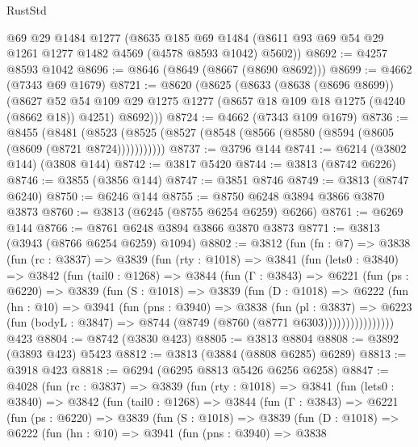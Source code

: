 \begin{lexlean}{RustStd}
\begin{coremodule}
    @69
    @29
    @1484
    @1277
    (@8635 @185 @69 @1484 (@8611 @93 @69 @54 @29 @1261 @1277 @1482 @4569 (@4578 @8593 @1042) @5602))
@8692 := @4257 @8593 @1042
@8696 := @8646 (@8649 (@8667 (@8690 @8692)))
@8699 := @4662 (@7343 @69 @1679)
@8721 := @8620
    (@8625
      (@8633
        (@8638 (@8696 @8699))
        (@8627
          @52
          @54
          @109
          @29
          @1275
          @1277
          (@8657 @18 @109 @18 @1275 (@4240 (@8662 @18)) @4251)
          @8692)))
@8724 := @4662 (@7343 @109 @1679)
@8736 := @8455
    (@8481 (@8523 (@8525 (@8527 (@8548 (@8566 (@8580 (@8594 (@8605 (@8609 (@8721 @8724)))))))))))
@8737 := @3796 @144
@8741 := @6214 (@3802 @144) (@3808 @144)
@8742 := @3817 @5420
@8744 := @3813 (@8742 @6226)
@8746 := @3855 (@3856 @144)
@8747 := @3851 @8746
@8749 := @3813 (@8747 @6240)
@8750 := @6246 @144
@8755 := @8750 @6248 @3894 @3866 @3870 @3873
@8760 := @3813 (@6245 (@8755 @6254 @6259) @6266)
@8761 := @6269 @144
@8766 := @8761 @6248 @3894 @3866 @3870 @3873
@8771 := @3813 (@3943 (@8766 @6254 @6259) @1094)
@8802 := @3812
    (fun (fn : @7) =>
    @3838
      (fun (rc : @3837) =>
      @3839
        (fun (rty : @1018) =>
        @3841
          (fun (lets0 : @3840) =>
          @3842
            (fun (tail0 : @1268) =>
            @3844
              (fun (Γ : @3843) =>
              @6221
                (fun (ps : @6220) =>
                @3839
                  (fun (S : @1018) =>
                  @3839
                    (fun (D : @1018) =>
                    @6222
                      (fun (hn : @10) =>
                      @3941
                        (fun (pns : @3940) =>
                        @3838
                          (fun (pl : @3837) =>
                          @6223
                            (fun (bodyL : @3847) => @8744 (@8749 (@8760 (@8771 @6303))))))))))))))))
    @423
@8804 := @8742 (@3830 @423)
@8805 := @3813 @8804
@8808 := @3892 (@3893 @423) @5423
@8812 := @3813 (@3884 (@8808 @6285) @6289)
@8813 := @3918 @423
@8818 := @6294 (@6295 @8813 @5426 @6256 @6258)
@8847 := @4028
    (fun (rc : @3837) =>
    @3839
      (fun (rty : @1018) =>
      @3841
        (fun (lets0 : @3840) =>
        @3842
          (fun (tail0 : @1268) =>
          @3844
            (fun (Γ : @3843) =>
            @6221
              (fun (ps : @6220) =>
              @3839
                (fun (S : @1018) =>
                @3839
                  (fun (D : @1018) =>
                  @6222
                    (fun (hn : @10) =>
                    @3941
                      (fun (pns : @3940) =>
                      @3838

\end{coremodule}
\end{lexlean}
